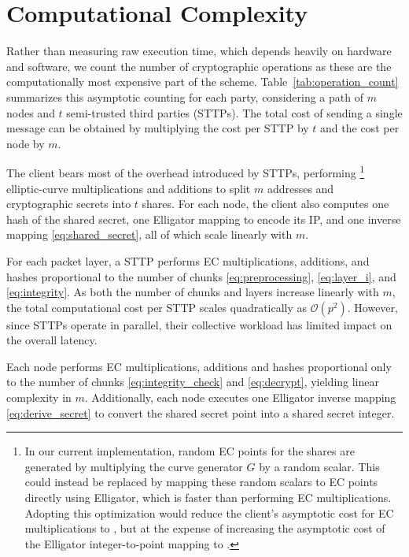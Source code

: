 \section{Computational Complexity}\label{app:complexity}

Rather than measuring raw execution time, which depends heavily on hardware and software, we count the number of cryptographic operations as these are the computationally most expensive part of the scheme.
Table~\ref{tab:operation_count} summarizes this asymptotic counting for each party, considering a path of $m$ nodes and $t$ semi-trusted third parties (STTPs).  
The total cost of sending a single message can be obtained by multiplying the cost per STTP by $t$ and the cost per node by $m$.

The client bears most of the overhead introduced by STTPs, performing \footnote{\label{cnote}
    In our current implementation, random EC points for the shares are generated by multiplying the curve generator $G$ by a random scalar.  
    This could instead be replaced by mapping these random scalars to EC points directly using Elligator, which is faster than performing EC multiplications.
    Adopting this optimization would reduce the client's asymptotic cost for EC multiplications to ,  
    but at the expense of increasing the asymptotic cost of the Elligator integer-to-point mapping to .
}
elliptic-curve multiplications and additions to split $m$ addresses and cryptographic secrets into $t$ shares.  
For each node, the client also computes one hash of the shared secret, one Elligator mapping to encode its IP, and one inverse mapping \eqref{eq:shared_secret}, all of which scale linearly with $m$.

For each packet layer, a STTP performs EC multiplications, additions, and hashes proportional to the number of chunks \eqref{eq:preprocessing}, \eqref{eq:layer_i},  and \eqref{eq:integrity}.  
As both the number of chunks and layers increase linearly with $m$, the total computational cost per STTP scales quadratically as $\mathcal{O}(p^2)$.  
However, since STTPs operate in parallel, their collective workload has limited impact on the overall latency.

Each node performs EC multiplications, additions and hashes proportional only to the number of chunks \eqref{eq:integrity_check} and \eqref{eq:decrypt}, yielding linear complexity in $m$.  
Additionally, each node executes one Elligator inverse mapping \eqref{eq:derive_secret} to convert the shared secret point into a shared secret integer.

